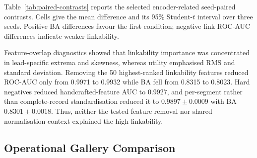 \documentclass[journal]{IEEEtran}
\begin{document}
Table~\ref{tab:paired-contrasts} reports the selected encoder-related
seed-paired contrasts. Cells give the mean difference and its 95\% Student-$t$
interval over three seeds. Positive BA differences favour the first condition;
negative link ROC-AUC differences indicate weaker linkability.

\begin{table}[ht]
\centering
\scriptsize
\setlength{\tabcolsep}{2.2pt}
\caption{Paired changes in the main comparison.}
\label{tab:paired-contrasts}
\end{table}

Feature-overlap diagnostics showed that linkability importance was
concentrated in lead-specific extrema and skewness,
whereas utility emphasised RMS and standard deviation. Removing the 50
highest-ranked linkability features reduced ROC-AUC only from 0.9971 to 0.9932
while BA fell from 0.8315 to 0.8023. Hard negatives reduced
handcrafted-feature AUC to 0.9927, and per-segment rather than complete-record
standardisation reduced it
to $0.9897\mathbin{\pm}0.0009$ with BA
$0.8301\mathbin{\pm}0.0018$. Thus, neither the tested feature removal nor
shared normalisation context explained the high linkability.

\subsection{Operational Gallery Comparison}
\label{subsec:results-operational}
\end{document}
